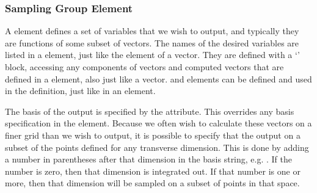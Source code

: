 \documentclass[letterpaper,10pt,english]{sphinxmanual}
\begin{document}
\subsubsection{Sampling Group Element}
\label{\detokenize{reference_elements:sampling-group-element}}\label{\detokenize{reference_elements:samplinggroupelement}}\label{\detokenize{reference_elements:index-91}}
\sphinxAtStartPar
A  element defines a set of variables that we wish to output, and typically they are functions of some subset of vectors.  The names of the desired variables are listed in a  element, just like the  element of a vector.  They are defined with a ‘{\hyperref[\detokenize{reference_elements:xmdscsyntax}]{}}’ block, accessing any components of vectors and computed vectors that are defined in a {\hyperref[\detokenize{reference_elements:dependencies}]{}} element, also just like a vector.  {\hyperref[\detokenize{reference_elements:computedvectorelement}]{}} and {\hyperref[\detokenize{reference_elements:operatorelement}]{}} elements can be defined and used in the definition, just like in an {\hyperref[\detokenize{reference_elements:integrateelement}]{}} element.

\ignorespaces 
\sphinxAtStartPar
The basis of the output is specified by the  attribute.  This overrides any basis specification in the  element.  Because we often wish to calculate these vectors on a finer grid than we wish to output, it is possible to specify that the output on a subset of the points defined for any transverse dimension.  This is done by adding a number in parentheses after that dimension in the basis string, e.g. .  If the number is zero, then that dimension is integrated out.  If that number is one or more, then that dimension will be sampled on a subset of points in that space.
\end{document}
